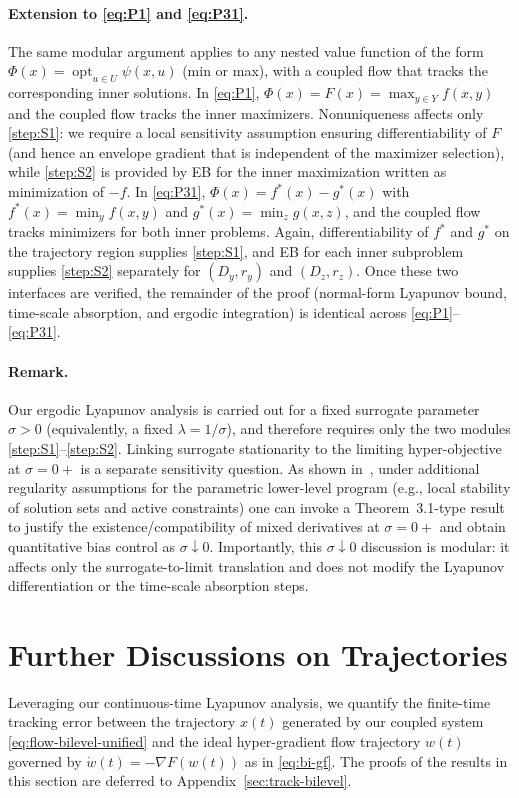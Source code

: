 \documentclass{article}
\newcommand{\1}{\mathbf{1}}
\begin{document}
\paragraph{Extension to \ref{eq:P1} and \ref{eq:P31}.}
The same modular argument applies to any nested value function of the form
$\Phi(x)=\operatorname{opt}_{u\in U}\psi(x,u)$ (min or max), with a coupled flow that tracks the corresponding inner solutions.
In \ref{eq:P1}, $\Phi(x)=F(x)=\max_{y\in Y} f(x,y)$ and the coupled flow tracks the inner maximizers.
Nonuniqueness affects only \ref{step:S1}: we require a local sensitivity assumption ensuring differentiability of $F$
(and hence an envelope gradient that is independent of the maximizer selection), while \ref{step:S2} is provided by EB
for the inner maximization written as minimization of $-f$.
In \ref{eq:P31}, $\Phi(x)=f^*(x)-g^*(x)$ with $f^*(x)=\min_y f(x,y)$ and $g^*(x)=\min_z g(x,z)$,
and the coupled flow tracks minimizers for both inner problems.
Again, differentiability of $f^*$ and $g^*$ on the trajectory region supplies \ref{step:S1}, and EB for each inner
subproblem supplies \ref{step:S2} separately for $(D_y,r_y)$ and $(D_z,r_z)$.
Once these two interfaces are verified, the remainder of the proof (normal-form Lyapunov bound, time-scale absorption,
and ergodic integration) is identical across \ref{eq:P1}--\ref{eq:P31}.

\paragraph{Remark.}\label{rem:sigma-zero-link}
Our ergodic Lyapunov analysis is carried out for a fixed surrogate parameter $\sigma>0$
(equivalently, a fixed $\lambda=1/\sigma$), and therefore requires only the two modules \ref{step:S1}--\ref{step:S2}.
Linking surrogate stationarity to the limiting hyper-objective at $\sigma=0+$ is a separate sensitivity question.
As shown in~\cite{kwon2023penalty}, under additional regularity assumptions for the parametric lower-level program
(e.g., local stability of solution sets and active constraints) one can invoke a Theorem~3.1-type result to justify
the existence/compatibility of mixed derivatives at $\sigma=0+$ and obtain quantitative bias control as $\sigma\downarrow 0$.
Importantly, this $\sigma\downarrow 0$ discussion is modular: it affects only the surrogate-to-limit translation and
does not modify the Lyapunov differentiation or the time-scale absorption steps.

\section{Further Discussions on Trajectories}
\label{sec:track-bilevel0}
Leveraging our continuous-time Lyapunov analysis, we quantify the finite-time tracking error between the trajectory $x(t)$ generated by our coupled system \eqref{eq:flow-bilevel-unified} and the ideal hyper-gradient flow trajectory $w(t)$ governed by $\dot w(t) = -\nabla F(w(t))$ as in \eqref{eq:bi-gf}. The proofs of the results in this section are deferred to Appendix~\ref{sec:track-bilevel}.
\end{document}
